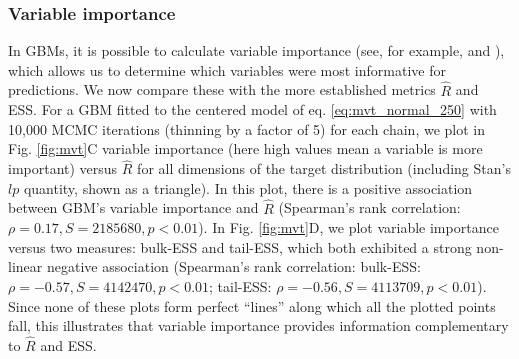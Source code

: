 \documentclass[ba]{imsart}
\numberwithin{equation}{section}
\theoremstyle{plain}
\begin{document}
\subsubsection{Variable importance}\label{sec:multivariate_normal_varimportance}
In GBMs, it is possible to calculate variable importance (see, for example, \cite{friedman2001greedy} and \cite{greenwell2019package}), which allows us to determine which variables were most informative for predictions. We now compare these with the more established metrics $\widehat{R}$ and ESS. For a GBM fitted to the centered model of eq. \eqref{eq:mvt_normal_250} with 10,000 MCMC iterations (thinning by a factor of 5) for each chain, we plot in Fig. \ref{fig:mvt}C variable importance (here high values mean a variable is more important) versus $\widehat{R}$ for all dimensions of the target distribution (including Stan's $lp$ quantity, shown as a triangle). In this plot, there is a positive association between GBM's variable importance and $\widehat{R}$ (Spearman's rank correlation: $\rho=0.17, S=2185680, p<0.01$). In Fig.  \ref{fig:mvt}D, we plot variable importance versus two measures: bulk-ESS and tail-ESS, which both exhibited a strong non-linear negative association (Spearman's rank correlation: bulk-ESS: $\rho=-0.57, S=4142470, p<0.01$; tail-ESS: $\rho=-0.56, S=4113709, p<0.01$). Since none of these plots form perfect ``lines'' along which all the plotted points fall, this illustrates that variable importance provides information complementary to $\widehat{R}$ and ESS.
\end{document}
